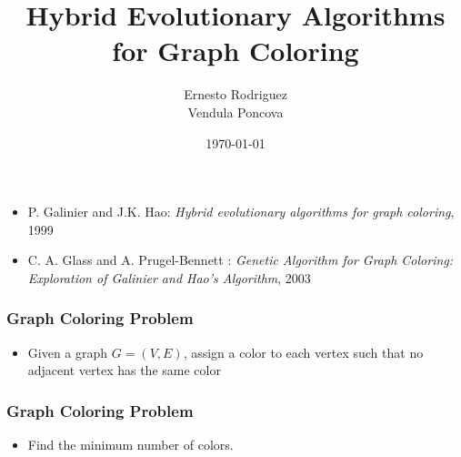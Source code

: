 \documentclass{beamer}
\title{Hybrid Evolutionary Algorithms for Graph Coloring}
\author{Ernesto Rodriguez\\Vendula Poncova}
\date{\today}
\begin{document}
 
\frame{\titlepage}

\begin{frame}
\begin{itemize}
\item P. Galinier and J.K. Hao: \textit{Hybrid evolutionary algorithms for graph coloring}, 1999
\item C. A. Glass and A. Prugel-Bennett : \textit{Genetic Algorithm for Graph Coloring: Exploration
of Galinier and Hao’s Algorithm}, 2003
\end{itemize}
\end{frame}

\begin{frame}
\frametitle{Graph Coloring Problem}
\begin{itemize}
\item Given a graph $G=(V,E)$, assign a color to each vertex such that no adjacent vertex has the same color
\end{itemize}

\end{frame}

\begin{frame}
\frametitle{Graph Coloring Problem}
\begin{itemize}
\item Find the minimum number of colors.
\end{itemize}
\end{frame}
\end{document}
